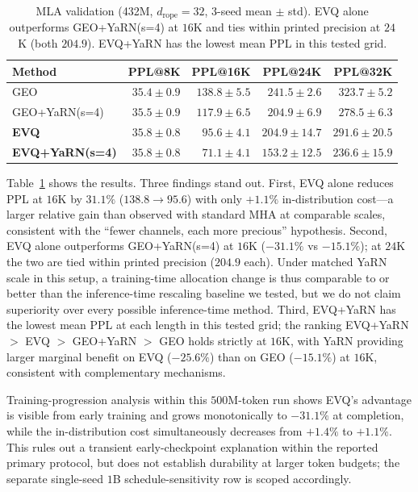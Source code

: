 \begin{table}[ht]
\caption{MLA validation (432M, \(d_{\mathrm{rope}}{=}32\), 3-seed mean \(\pm\) std). EVQ alone outperforms GEO+YaRN(s=4) at $16$K and ties within printed precision at $24$K (both $204.9$). EVQ+YaRN has the lowest mean PPL in this tested grid.}
\label{tab:mla}
\centering
\small
\begin{tabular}{@{}l r r r r@{}}
\toprule
Method & PPL@8K & PPL@16K & PPL@24K & PPL@32K \\
\midrule
GEO & $35.4{\pm}0.9$ & $138.8{\pm}5.5$ & $241.5{\pm}2.6$ & $323.7{\pm}5.2$ \\
GEO+YaRN(s=4) & $35.5{\pm}0.9$ & $117.9{\pm}6.5$ & $204.9{\pm}6.9$ & $278.5{\pm}6.3$ \\
\textbf{EVQ} & $35.8{\pm}0.8$ & $\mathbf{95.6{\pm}4.1}$ & $204.9{\pm}14.7$ & $291.6{\pm}20.5$ \\
\textbf{EVQ+YaRN(s=4)} & $35.8{\pm}0.8$ & $\mathbf{71.1{\pm}4.1}$ & $\mathbf{153.2{\pm}12.5}$ & $\mathbf{236.6{\pm}15.9}$ \\
\bottomrule
\end{tabular}
\end{table}

Table~\ref{tab:mla} shows the results. Three findings stand out. First, EVQ alone reduces PPL at \(16\mathrm{K}\) by \(31.1\%\) (\(138.8 \to 95.6\)) with only \(+1.1\%\) in-distribution cost---a larger relative gain than observed with standard MHA at comparable scales, consistent with the ``fewer channels, each more precious'' hypothesis. Second, EVQ alone outperforms GEO+YaRN(s=4) at \(16\mathrm{K}\) (\(-31.1\%\) vs \(-15.1\%\)); at \(24\mathrm{K}\) the two are tied within printed precision ($204.9$ each). Under matched YaRN scale in this setup, a training-time allocation change is thus comparable to or better than the inference-time rescaling baseline we tested, but we do not claim superiority over every possible inference-time method. Third, EVQ+YaRN has the lowest mean PPL at each length in this tested grid; the ranking EVQ+YaRN $>$ EVQ $>$ GEO+YaRN $>$ GEO holds strictly at $16$K, with YaRN providing larger marginal benefit on EVQ (\(-25.6\%\)) than on GEO (\(-15.1\%\)) at \(16\mathrm{K}\), consistent with complementary mechanisms.

Training-progression analysis within this $500$M-token run shows EVQ's advantage is visible from early training and grows monotonically to \(-31.1\%\) at completion, while the in-distribution cost simultaneously decreases from \(+1.4\%\) to \(+1.1\%\). This rules out a transient early-checkpoint explanation within the reported primary protocol, but does not establish durability at larger token budgets; the separate single-seed $1$B schedule-sensitivity row is scoped accordingly.

